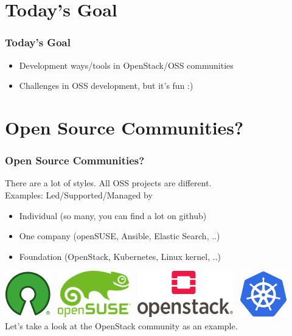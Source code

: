 \documentclass[aspectratio=169,11pt,hyperref={colorlinks=true}]{beamer}
\begin{document}
\section{Today's Goal}
\begin{frame}
  \frametitle{Today's Goal}
  \begin{itemize}
    \item Development ways/tools in OpenStack/OSS communities
    \item Challenges in OSS development, but it's fun :)
  \end{itemize}
\end{frame}

\section{Open Source Communities?}
\begin{frame}
  \frametitle{Open Source Communities?}
  There are a lot of styles. All OSS projects are different.\\
  Examples: Led/Supported/Managed by
  \begin{itemize}
    \item Individual (so many, you can find a lot on github)
    \item One company (openSUSE, Ansible, Elastic Search, ..)
    \item Foundation (OpenStack, Kubernetes, Linux kernel, ..)
  \end{itemize}
  \includegraphics[height=20mm]{images/osi-keyhole.png}~
  \includegraphics[height=20mm]{images/openSUSE-logo.png}~
  \includegraphics[height=20mm]{images/openstack-logo.png}~
  \includegraphics[height=20mm]{images/kubernetes-logo.png}
  \\
  Let's take a look at the OpenStack community as an example.
\end{frame}
\end{document}
